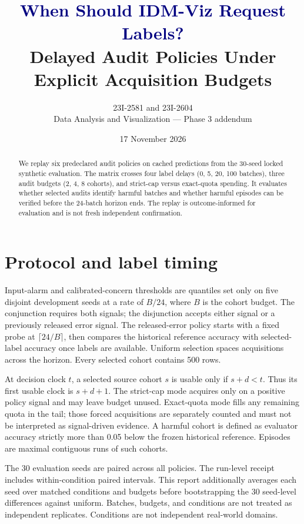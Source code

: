 \documentclass[10pt]{article}
\title{\textcolor{navy}{When Should IDM-Viz Request Labels?}\\[3pt]
\large Delayed Audit Policies Under Explicit Acquisition Budgets}
\author{23I-2581 and 23I-2604\\Data Analysis and Visualization --- Phase 3 addendum}
\date{17 November 2026}
\begin{document}
\maketitle
\begin{abstract}
We replay six predeclared audit policies on cached predictions from the 30-seed locked synthetic evaluation. The matrix crosses four label delays (0, 5, 20, 100 batches), three audit budgets (2, 4, 8 cohorts), and strict-cap versus exact-quota spending. It evaluates whether selected audits identify harmful batches and whether harmful episodes can be verified before the 24-batch horizon ends. The replay is outcome-informed for evaluation and is not fresh independent confirmation.
\end{abstract}
\section{Protocol and label timing}
Input-alarm and calibrated-concern thresholds are quantiles set only on five disjoint development seeds at a rate of $B/24$, where $B$ is the cohort budget. The conjunction requires both signals; the disjunction accepts either signal or a previously released error signal. The released-error policy starts with a fixed probe at $\lceil24/B\rceil$, then compares the historical reference accuracy with selected-label accuracy once labels are available. Uniform selection spaces acquisitions across the horizon. Every selected cohort contains 500 rows.

At decision clock $t$, a selected source cohort $s$ is usable only if $s+d<t$. Thus its first usable clock is $s+d+1$. The strict-cap mode acquires only on a positive policy signal and may leave budget unused. Exact-quota mode fills any remaining quota in the tail; those forced acquisitions are separately counted and must not be interpreted as signal-driven evidence. A harmful cohort is defined as evaluator accuracy strictly more than 0.05 below the frozen historical reference. Episodes are maximal contiguous runs of such cohorts.

The 30 evaluation seeds are paired across all policies. The run-level receipt includes within-condition paired intervals. This report additionally averages each seed over matched conditions and budgets before bootstrapping the 30 seed-level differences against uniform. Batches, budgets, and conditions are not treated as independent replicates. Conditions are not independent real-world domains.
\end{document}
